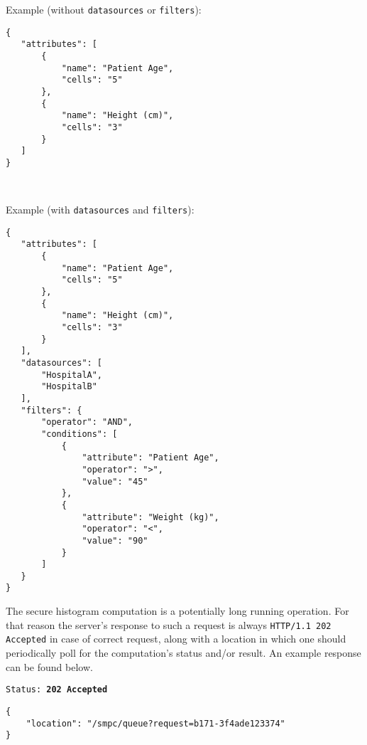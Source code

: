 \begin{description}[labelwidth=5em, leftmargin=\dimexpr\labelwidth+\labelsep\relax]
 \begin{minipage}{\linewidth}
   Example (without \texttt{datasources} or \texttt{filters}):
 {
 \begin{verbatim}
{
   "attributes": [
       {
           "name": "Patient Age",
           "cells": "5"
       },
       {
           "name": "Height (cm)",
           "cells": "3"
       }
   ]
}
 \end{verbatim}
 \label{sc:histogram-numerical-post-1}
 }
\end{minipage}

\ \\
 \begin{minipage}{\linewidth}
   Example (with \texttt{datasources} and \texttt{filters}):
 {
 \begin{verbatim}
{
   "attributes": [
       {
           "name": "Patient Age",
           "cells": "5"
       },
       {
           "name": "Height (cm)",
           "cells": "3"
       }
   ],
   "datasources": [
       "HospitalA",
       "HospitalB"
   ],
   "filters": {
       "operator": "AND",
       "conditions": [
           {
               "attribute": "Patient Age",
               "operator": ">",
               "value": "45"
           },
           {
               "attribute": "Weight (kg)",
               "operator": "<",
               "value": "90"
           }
       ]
   }
}
 \end{verbatim}
 \label{sc:histogram-numerical-post-2}
 }
\end{minipage}

\item[Response:] The secure histogram computation is a potentially long running operation. For that reason the server's response to such a request is always \texttt{HTTP/1.1 202 Accepted} in case of correct request, along with a location in which one should periodically poll for the computation's status and/or result. An example response can be found below.
\ \\

\begin{minipage}{\linewidth}
{
\texttt{Status: {\color{ForestGreen}\textbf{202 Accepted}}}
\begin{verbatim}
{
    "location": "/smpc/queue?request=b171-3f4ade123374"
}
\end{verbatim}
\label{sc:histogram-numerical-response-1}
}
\end{minipage}


\end{description}
